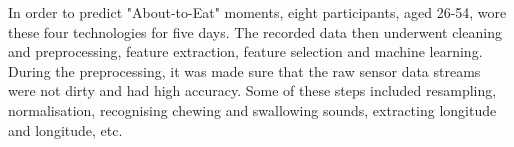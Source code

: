 
In order to predict "About-to-Eat" moments, eight participants, aged 26-54, wore these four technologies for five days. The recorded data then underwent cleaning and preprocessing, feature extraction, feature selection and machine learning. During the preprocessing, it was made sure that the raw sensor data streams were not dirty and had high accuracy. Some of these steps included resampling, normalisation, recognising chewing and swallowing sounds, extracting longitude and longitude, etc. 